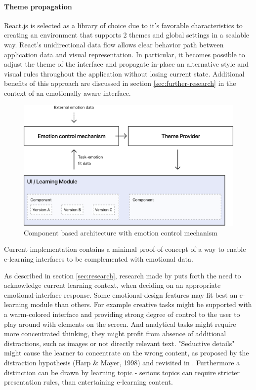 \paragraph{Theme propagation} React.js is selected as a library of choice due to it's favorable characteristics to creating an environment that supports 2 themes and global settings in a scalable way. React's unidirectional data flow allows clear behavior path between application data and visual representation. In particular, it becomes possible to adjust the theme of the interface and propagate in-place an alternative style and visual rules throughout the application without losing current state. Additional benefits of this approach are discussed in section \ref{sec:further-research} in the context of an emotionally aware interface.

\begin{figure}
	\centering
	\includegraphics[width=1\linewidth]{graphics/App-Architecture}
	\caption{Component based architecture with emotion control mechanism}
	\label{fig:app-architecture}
\end{figure}

Current implementation contains a minimal proof-of-concept of a way to enable e-learning interfaces to be complemented with emotional data. 

As described in section \ref{sec:research}, research made by \cite{Haaranen2015} puts forth the need to acknowledge current learning context, when deciding on an appropriate emotional-interface response. 
Some emotional-design features may fit best an e-learning module than others.
For example creative tasks might be supported with a warm-colored interface and providing strong degree of control to the user to play around with elements on the screen. 
And analytical tasks might require more concentrated thinking, they might profit from absence of additional distractions, such as images or not directly relevant text. "Seductive details" might cause the learner to concentrate on the wrong content, as proposed by the distraction hypothesis (Harp \& Mayer, 1998) and revisited in \cite{Chang2014}.
Furthermore a distinction can be drawn by learning topic - serious topics can require stricter presentation rules, than entertaining e-learning content.

